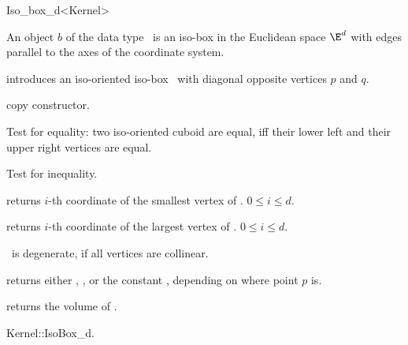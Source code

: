 \begin{ccRefClass} {Iso_box_d<Kernel>}

\ccDefinition  An object $b$ of the data type \ccRefName\ is an
iso-box in the Euclidean space $\E^d$ with edges parallel to the 
axes of the coordinate system.
 
\ccCreation
{}

            {introduces an iso-oriented iso-box \ccVar\ with diagonal
             opposite vertices $p$ and $q$. 
}

\ccHidden {}
            {copy constructor.}

\ccOperations

       {Test for equality: two iso-oriented cuboid are equal, iff their
        lower left and their upper right vertices are equal.}

       {Test for inequality.}





         {returns $i$-th  coordinate of
          the smallest vertex of \ccVar. 
          \ccPrecond $0 \leq i \leq d$.}

         {returns $i$-th  coordinate of
          the largest vertex of \ccVar. 
          \ccPrecond $0 \leq i \leq d$.}

\ccPredicates

       {%
        \ccVar\ is degenerate, if all vertices
        are collinear.}

       {returns either ,
        , or the constant
        , 
        depending on where point $p$ is.}

       {}
\ccGlue
{}
       {}
\ccGlue
{}
       {}


       {returns the volume of \ccVar. }

\ccSeeAlso
Kernel::IsoBox\_d. \\

\end{ccRefClass} 
